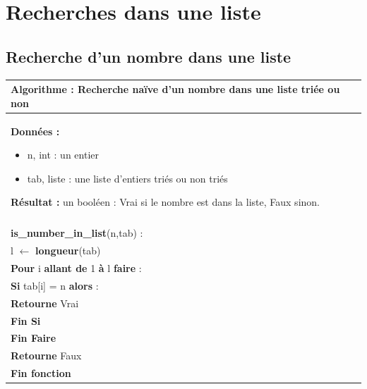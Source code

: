 \documentclass[10pt]{article}
\begin{document}


\setlength{\parskip}{0ex plus 0.2ex minus 0ex}
 \renewcommand{\contentsname}{}
 \renewcommand{\baselinestretch}{1}

\tableofcontents

 \renewcommand{\baselinestretch}{1.2}
\setlength{\parskip}{2ex plus 0.5ex minus 0.2ex}

\newpage


\section{Recherches dans une liste}
\subsection{Recherche d'un nombre dans une liste}


\begin{pseudo}
\begin{center}
\begin{tabular}{p{}}
\hline
\textbf{Algorithme :} Recherche naïve d'un nombre dans une liste triée ou non \\
\hline
\textbf{Données :}
\begin{itemize}
\item \textsf{n}, int : un entier 
\item \textsf{tab}, liste : une liste d'entiers triés ou non triés
\end{itemize}
\textbf{Résultat :} un booléen : \textsf{Vrai} si le nombre est dans la liste, \textsf{Faux} sinon. \\
\\
\textbf{is\_number\_in\_list}(\textsf{n},\textsf{tab}) :\\
\hspace{.4cm}\textsf{l} $\leftarrow$ \textbf{longueur}(\textsf{tab}) \\
\hspace{.4cm}\textbf{Pour} \textsf{i} \textbf{allant de} 1 \textbf{à} \textsf{l} \textbf{faire} : \\
\hspace{.8cm} \textbf{Si}  \textsf{tab[i] = n} \textbf{alors} :\\
\hspace{1.2cm}\textbf{Retourne} \textsf{Vrai} \\
\hspace{.8cm} \textbf{Fin Si} \\
\hspace{.4cm}\textbf{Fin Faire} \\
\hspace{.4cm}\textbf{Retourne} \textsf{Faux} \\
\textbf{Fin fonction} \\
\hline
\end{tabular}
\end{center}
\end{pseudo}
\end{document}
